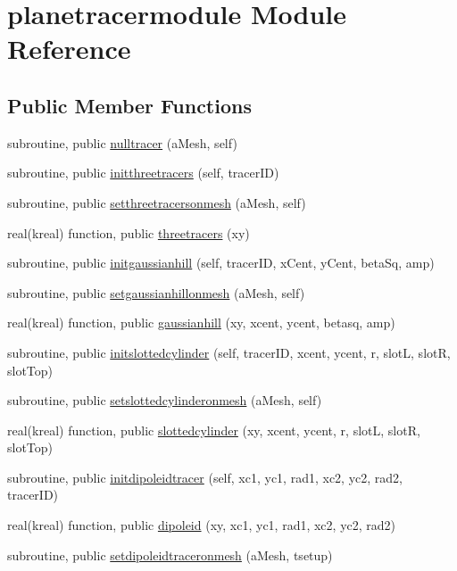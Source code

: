 \hypertarget{classplanetracermodule}{\section{planetracermodule Module Reference}
\label{classplanetracermodule}
}
\subsection*{Public Member Functions}
\begin{DoxyCompactItemize}
\item 
subroutine, public \hyperlink{classplanetracermodule_ad51498af761543349dc9ec1e2135d238}{nulltracer} (a\+Mesh, self)
\item 
subroutine, public \hyperlink{classplanetracermodule_a6cf107fcca7855aead1dd5129f514c07}{initthreetracers} (self, tracer\+I\+D)
\item 
subroutine, public \hyperlink{classplanetracermodule_a45228fd6c64c690fad54d401dbd77e08}{setthreetracersonmesh} (a\+Mesh, self)
\item 
real(kreal) function, public \hyperlink{classplanetracermodule_ae385dd82024d289fd1e1832ca2817f2b}{threetracers} (xy)
\item 
subroutine, public \hyperlink{classplanetracermodule_a7dedf32ac5e18e8617f21853ec61529f}{initgaussianhill} (self, tracer\+I\+D, x\+Cent, y\+Cent, beta\+Sq, amp)
\item 
subroutine, public \hyperlink{classplanetracermodule_a24b704ba1ff490dd5495caefa02c3b9f}{setgaussianhillonmesh} (a\+Mesh, self)
\item 
real(kreal) function, public \hyperlink{classplanetracermodule_a9dd192681848ae654d8cb215fca5762d}{gaussianhill} (xy, xcent, ycent, betasq, amp)
\item 
subroutine, public \hyperlink{classplanetracermodule_a4c7acdd3c9f752375810b745d49d26c6}{initslottedcylinder} (self, tracer\+I\+D, xcent, ycent, r, slot\+L, slot\+R, slot\+Top)
\item 
subroutine, public \hyperlink{classplanetracermodule_a776d10a5567de5c0a0c874f3134c8d45}{setslottedcylinderonmesh} (a\+Mesh, self)
\item 
real(kreal) function, public \hyperlink{classplanetracermodule_ac108fd2441f0acefbe3b4f0398452c2a}{slottedcylinder} (xy, xcent, ycent, r, slot\+L, slot\+R, slot\+Top)
\item 
subroutine, public \hyperlink{classplanetracermodule_a0166fc147ae02a69fa856b826ce7d889}{initdipoleidtracer} (self, xc1, yc1, rad1, xc2, yc2, rad2, tracer\+I\+D)
\item 
real(kreal) function, public \hyperlink{classplanetracermodule_ab4a56614d794accc516d49052fc3688d}{dipoleid} (xy, xc1, yc1, rad1, xc2, yc2, rad2)
\item 
subroutine, public \hyperlink{classplanetracermodule_acb6df401cce54121b007b0a828d32e7b}{setdipoleidtraceronmesh} (a\+Mesh, tsetup)
\end{DoxyCompactItemize}


